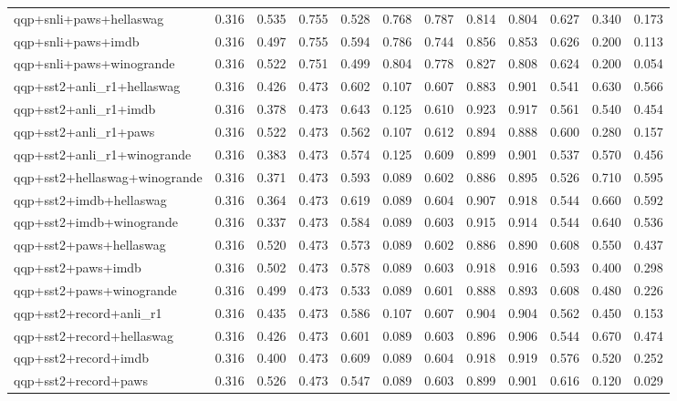 \begin{table}[t]
\begin{tabular}{lrrrrrrrrrrr}
    qqp+snli+paws+hellaswag & 0.316 & 0.535 & 0.755 & 0.528 & 0.768 & 0.787 & 0.814 & 0.804 & 0.627 & 0.340 & 0.173 \\
    qqp+snli+paws+imdb & 0.316 & 0.497 & 0.755 & 0.594 & 0.786 & 0.744 & 0.856 & 0.853 & 0.626 & 0.200 & 0.113 \\
    qqp+snli+paws+winogrande & 0.316 & 0.522 & 0.751 & 0.499 & 0.804 & 0.778 & 0.827 & 0.808 & 0.624 & 0.200 & 0.054 \\
    qqp+sst2+anli\_r1+hellaswag & 0.316 & 0.426 & 0.473 & 0.602 & 0.107 & 0.607 & 0.883 & 0.901 & 0.541 & 0.630 & 0.566 \\
    qqp+sst2+anli\_r1+imdb & 0.316 & 0.378 & 0.473 & 0.643 & 0.125 & 0.610 & 0.923 & 0.917 & 0.561 & 0.540 & 0.454 \\
    qqp+sst2+anli\_r1+paws & 0.316 & 0.522 & 0.473 & 0.562 & 0.107 & 0.612 & 0.894 & 0.888 & 0.600 & 0.280 & 0.157 \\
    qqp+sst2+anli\_r1+winogrande & 0.316 & 0.383 & 0.473 & 0.574 & 0.125 & 0.609 & 0.899 & 0.901 & 0.537 & 0.570 & 0.456 \\
    qqp+sst2+hellaswag+winogrande & 0.316 & 0.371 & 0.473 & 0.593 & 0.089 & 0.602 & 0.886 & 0.895 & 0.526 & 0.710 & 0.595 \\
    qqp+sst2+imdb+hellaswag & 0.316 & 0.364 & 0.473 & 0.619 & 0.089 & 0.604 & 0.907 & 0.918 & 0.544 & 0.660 & 0.592 \\
    qqp+sst2+imdb+winogrande & 0.316 & 0.337 & 0.473 & 0.584 & 0.089 & 0.603 & 0.915 & 0.914 & 0.544 & 0.640 & 0.536 \\
    qqp+sst2+paws+hellaswag & 0.316 & 0.520 & 0.473 & 0.573 & 0.089 & 0.602 & 0.886 & 0.890 & 0.608 & 0.550 & 0.437 \\
    qqp+sst2+paws+imdb & 0.316 & 0.502 & 0.473 & 0.578 & 0.089 & 0.603 & 0.918 & 0.916 & 0.593 & 0.400 & 0.298 \\
    qqp+sst2+paws+winogrande & 0.316 & 0.499 & 0.473 & 0.533 & 0.089 & 0.601 & 0.888 & 0.893 & 0.608 & 0.480 & 0.226 \\
    qqp+sst2+record+anli\_r1 & 0.316 & 0.435 & 0.473 & 0.586 & 0.107 & 0.607 & 0.904 & 0.904 & 0.562 & 0.450 & 0.153 \\
    qqp+sst2+record+hellaswag & 0.316 & 0.426 & 0.473 & 0.601 & 0.089 & 0.603 & 0.896 & 0.906 & 0.544 & 0.670 & 0.474 \\
    qqp+sst2+record+imdb & 0.316 & 0.400 & 0.473 & 0.609 & 0.089 & 0.604 & 0.918 & 0.919 & 0.576 & 0.520 & 0.252 \\
    qqp+sst2+record+paws & 0.316 & 0.526 & 0.473 & 0.547 & 0.089 & 0.603 & 0.899 & 0.901 & 0.616 & 0.120 & 0.029 \\

\end{tabular}
\end{table}
